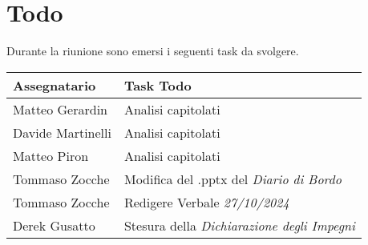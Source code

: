 \section{Todo}
Durante la riunione sono emersi i seguenti task da svolgere.

\begin{center}
  \begin{tabular}{|p{5cm}|p{8cm}|}
    \hline
    \textbf{Assegnatario}       & \textbf{Task Todo}                             \\ \hline
    Matteo Gerardin   & Analisi capitolati \\ \hline
    Davide Martinelli   & Analisi capitolati \\ \hline
    Matteo Piron   & Analisi capitolati \\ \hline
    Tommaso Zocche & Modifica del .pptx del \textit{Diario di Bordo} \\ \hline
    Tommaso Zocche   & Redigere Verbale \textit{27/10/2024} 
    \\ \hline
    Derek Gusatto   & Stesura della \textit{Dichiarazione degli Impegni} \\ \hline
  \end{tabular}
\end{center}
